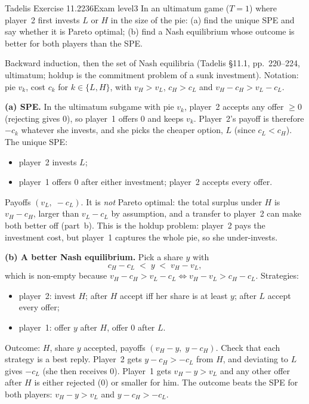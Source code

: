 \begin{exsol}{Tadelis Exercise 11.2}{236}{Exam level}{3}
\asked In an ultimatum game ($T = 1$) where player~2 first invests $L$ or $H$ in the size of the pie:
(a) find the unique SPE and say whether it is Pareto optimal; (b) find a Nash equilibrium whose outcome
is better for both players than the SPE.

\method Backward induction, then the set of Nash equilibria (Tadelis \S11.1, pp.~220--224, ultimatum;
holdup is the commitment problem of a sunk investment). Notation: pie $v_k$, cost $c_k$ for $k \in \{L,H\}$,
with $v_H > v_L$, $c_H > c_L$ and $v_H - c_H > v_L - c_L$.

\solution
\textbf{(a) SPE.} In the ultimatum subgame with pie $v_k$, player~2 accepts any offer $\ge 0$ (rejecting
gives $0$), so player~1 offers $0$ and keeps $v_k$. Player~2's payoff is therefore $-c_k$ whatever she
invests, and she picks the cheaper option, $L$ (since $c_L < c_H$). The unique SPE:
\begin{itemize}
  \item player~2 invests $L$;
  \item player~1 offers $0$ after either investment; player~2 accepts every offer.
\end{itemize}
Payoffs $(v_L,\; -c_L)$. It is \emph{not} Pareto optimal: the total surplus under $H$ is $v_H - c_H$, larger than
$v_L - c_L$ by assumption, and a transfer to player~2 can make both better off (part~b). This is the holdup
problem: player~2 pays the investment cost, but player~1 captures the whole pie, so she under-invests.

\textbf{(b) A better Nash equilibrium.} Pick a share $y$ with
\[
  c_H - c_L \;<\; y \;<\; v_H - v_L ,
\]
which is non-empty because $v_H - c_H > v_L - c_L \iff v_H - v_L > c_H - c_L$. Strategies:
\begin{itemize}
  \item player~2: invest $H$; after $H$ accept iff her share is at least $y$; after $L$ accept every offer;
  \item player~1: offer $y$ after $H$, offer $0$ after $L$.
\end{itemize}
Outcome: $H$, share $y$ accepted, payoffs $(v_H - y,\; y - c_H)$. Check that each strategy is a best reply.
Player~2 gets $y - c_H > -c_L$ from $H$, and deviating to $L$ gives $-c_L$ (she then receives $0$). Player~1
gets $v_H - y > v_L$ and any other offer after $H$ is either rejected ($0$) or smaller for him. The
outcome beats the SPE for both players: $v_H - y > v_L$ and $y - c_H > -c_L$.


\end{exsol}
